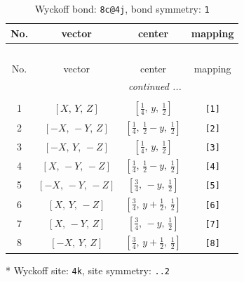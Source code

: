 \documentclass[fleqn,8pt]{jsarticle}
\begin{document}
\renewcommand{\arraystretch}{1.2}
\begin{longtable}{cccc}
\caption{Wyckoff bond: {\tt 8c@4j}, bond symmetry: {\tt 1}}
 \\
 \hline \hline
No. & vector & center & mapping \\ \hline \endfirsthead

\multicolumn{3}{l}{\tablename\ \thetable{}} \\
 \hline \hline
No. & vector & center & mapping \\ \hline \endhead

 \hline \hline
\multicolumn{3}{r}{\footnotesize\it continued ...} \\ \endfoot

 \hline \hline
\multicolumn{3}{r}{} \\ \endlastfoot

1 & $\left[ X,\, Y,\, Z \right]$ & $\left[ \frac{1}{4},\, y,\, \frac{1}{2} \right]$ & {\tt [1]} \\ \hline
2 & $\left[ - X,\, - Y,\, Z \right]$ & $\left[ \frac{1}{4},\, \frac{1}{2} - y,\, \frac{1}{2} \right]$ & {\tt [2]} \\ \hline
3 & $\left[ - X,\, Y,\, - Z \right]$ & $\left[ \frac{1}{4},\, y,\, \frac{1}{2} \right]$ & {\tt [3]} \\ \hline
4 & $\left[ X,\, - Y,\, - Z \right]$ & $\left[ \frac{1}{4},\, \frac{1}{2} - y,\, \frac{1}{2} \right]$ & {\tt [4]} \\ \hline
5 & $\left[ - X,\, - Y,\, - Z \right]$ & $\left[ \frac{3}{4},\, - y,\, \frac{1}{2} \right]$ & {\tt [5]} \\ \hline
6 & $\left[ X,\, Y,\, - Z \right]$ & $\left[ \frac{3}{4},\, y + \frac{1}{2},\, \frac{1}{2} \right]$ & {\tt [6]} \\ \hline
7 & $\left[ X,\, - Y,\, Z \right]$ & $\left[ \frac{3}{4},\, - y,\, \frac{1}{2} \right]$ & {\tt [7]} \\ \hline
8 & $\left[ - X,\, Y,\, Z \right]$ & $\left[ \frac{3}{4},\, y + \frac{1}{2},\, \frac{1}{2} \right]$ & {\tt [8]} \\
\end{longtable}
* Wyckoff site: {\tt 4k}, site symmetry: {\tt ..2}
\renewcommand{\arraystretch}{1.2}
\end{document}
